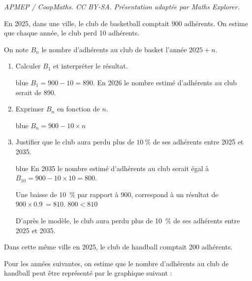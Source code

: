 \documentclass[10pt]{article}
\providecommand{\np}[2][]{{#2~#1}}
\begin{document}
\noindent\textit{APMEP / CoopMaths. CC BY-SA. Présentation adaptée par Maths Explorer.}\par\medskip
En 2025, dans une ville, le club de basketball comptait 900 adhérents. On estime que chaque année, le club perd 10 adhérents.
	
	On note $B_{n}$ le nombre d'adhérents au club de basket l'année $2025+n$.
	
	\begin{enumerate}
		\item Calculer $B_{1}$ et interpréter le résultat.
		
		\begin{color}{blue}
		$B_{1} = 900 - 10 = 890$. En 2026 le nombre estimé d'adhérents au club serait de 890.
		\end{color}		
			
		
		\item Exprimer $B_{n}$ en fonction de $n$.
		
		\begin{color}{blue}
		$B_{n} = 900 - 10\times n $
		\end{color}		
	
	
	
		\item Justifier que le club aura perdu plus de $10~\%$ de ses adhérents entre 2025 et 2035.
		
		\begin{color}{blue}
		En 2035 le nombre estimé d'adhérents au club serait égal à $B_{10} = 900 - 10\times 10 = 800 $.
		
		Une baisse de 10~\% par rapport à 900, correspond à un résultat de $900\times \np{0.9} = 810$. $800 < 810$
		
		D'après le modèle, le club aura perdu plus de 10~\% de ses adhérents entre 2025 et 2035. 
		\end{color}		
		
	\end{enumerate}
	
	Dans cette même ville en 2025, le club de handball comptait 200 adhérents.
	
	Pour les années suivantes, on estime que le nombre d'adhérents au club de handball peut être représenté par le graphique suivant :
	
\end{document}
